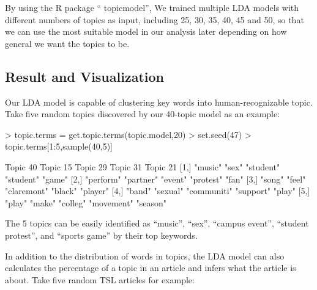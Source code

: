 \documentclass[a4paper]{article}
\begin{document}
By using the R package `` topicmodel'', We trained multiple LDA models with different numbers of topics as input, including 25, 30, 35, 40, 45 and 50, so that we can use the most suitable model in our analysis later depending on how general we want the topics to be.

\subsection{Result and Visualization}

Our LDA model is capable of clustering key words into human-recognizable topic. Take five random topics discovered by our 40-topic model as an example:

\begin{Schunk}
\begin{Sinput}
> topic.terms = get.topic.terms(topic.model,20)
> set.seed(47)
> topic.terms[1:5,sample(40,5)]
\end{Sinput}
\begin{Soutput}
     Topic 40  Topic 15  Topic 29    Topic 31   Topic 21
[1,] "music"   "sex"     "student"   "student"  "game"  
[2,] "perform" "partner" "event"     "protest"  "fan"   
[3,] "song"    "feel"    "claremont" "black"    "player"
[4,] "band"    "sexual"  "communiti" "support"  "play"  
[5,] "play"    "make"    "colleg"    "movement" "season"
\end{Soutput}
\end{Schunk}

The 5 topics can be easily identified as ``music'', ``sex'', ``campus event'', ``student protest'', and ``sports game'' by their top keywords.

In addition to the distribution of words in topics, the LDA model can also calculates the percentage of a topic in an article and infers what the article is about. Take five random TSL articles for example:
\end{document}
